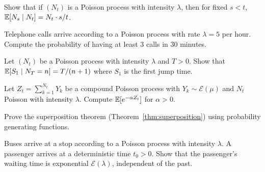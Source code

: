 \begin{exercise}
Show that if $(N_t)$ is a Poisson process with intensity $\lambda$, then for
fixed $s < t$, $\mathbb{E}[N_s \mid N_t] = N_t \cdot s/t$.
\end{exercise}

\begin{exercise}
Telephone calls arrive according to a Poisson process with rate $\lambda = 5$
per hour. Compute the probability of having at least $3$ calls in $30$ minutes.
\end{exercise}

\begin{exercise}
Let $(N_t)$ be a Poisson process with intensity $\lambda$ and $T > 0$. Show
that $\mathbb{E}[S_1 \mid N_T = n] = T/(n+1)$ where $S_1$ is the first jump time.
\end{exercise}

\begin{exercise}
Let $Z_t = \sum_{k=1}^{N_t} Y_k$ be a compound Poisson process with
$Y_k \sim \mathcal{E}(\mu)$ and $N_t$ Poisson with intensity $\lambda$. Compute
$\mathbb{E}[e^{-\alpha Z_t}]$ for $\alpha > 0$.
\end{exercise}

\begin{exercise}
Prove the superposition theorem (Theorem~\ref{thm:superposition}) using
probability generating functions.
\end{exercise}

\begin{exercise}
Buses arrive at a stop according to a Poisson process with intensity $\lambda$.
A passenger arrives at a deterministic time $t_0 > 0$. Show that the passenger's
waiting time is exponential $\mathcal{E}(\lambda)$, independent of the past.
\end{exercise}
